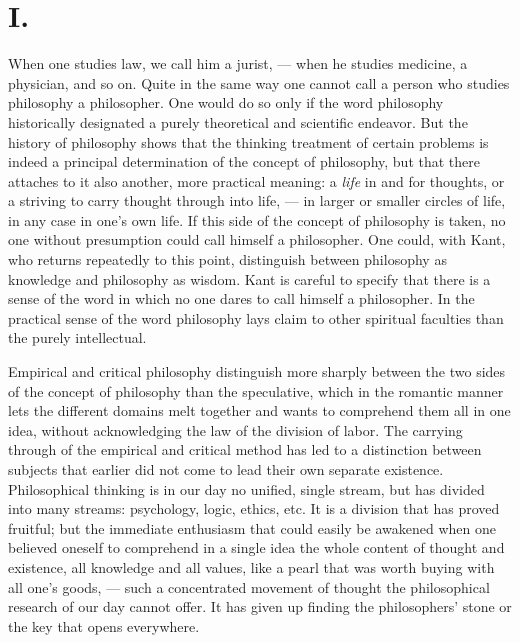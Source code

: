 \documentclass[12pt,a4paper,openany]{book}
\newcommand{\opage}[1]{\marginnote{\footnotesize\textit{[#1]}}}
\begin{document}
\section*{I.}

When one studies law, we call him a jurist, --- when
he studies medicine, a physician, and so on. Quite
in the same way one cannot call a person who studies
philosophy a philosopher. One would do so only if the word philosophy
historically designated a purely theoretical and scientific
endeavor. But the history of philosophy shows that the thinking
treatment of certain problems is indeed a principal determination
of the concept of philosophy, but that there attaches to it also
another, more practical meaning: a \emph{life} in and for thoughts,
or a striving to carry thought through into life, --- in
larger or smaller circles of life, in any case in one's
own life. If this side of the concept of philosophy is taken, no one
without presumption could call himself a philosopher. One
could, with Kant, who returns repeatedly to this point,
distinguish between philosophy as knowledge and philosophy as wisdom.
Kant is careful to specify that there is a
sense of the word in which no one dares to call himself a philosopher.
In the practical sense of the word philosophy lays claim
to other spiritual faculties than the purely intellectual.

Empirical and critical philosophy distinguish more sharply
between the two sides of the concept of philosophy than the
speculative, which in the romantic manner lets the different domains
melt together and wants to comprehend them all in one idea,
without acknowledging the law of the division of labor.
The carrying through of the empirical and critical method has led to
a distinction between subjects that earlier did not come to lead
\opage{181}their own separate existence. Philosophical thinking is in our
day no unified, single stream, but has divided into many
streams: psychology, logic, ethics, etc. It is a division
that has proved fruitful; but the immediate enthusiasm
that could easily be awakened when one believed oneself to
comprehend in a single idea the whole content of thought and existence, all
knowledge and all values, like a pearl that was worth
buying with all one's goods, --- such a concentrated
movement of thought the philosophical research of our day cannot offer.
It has given up finding the philosophers' stone or the key that
opens everywhere.
\end{document}

